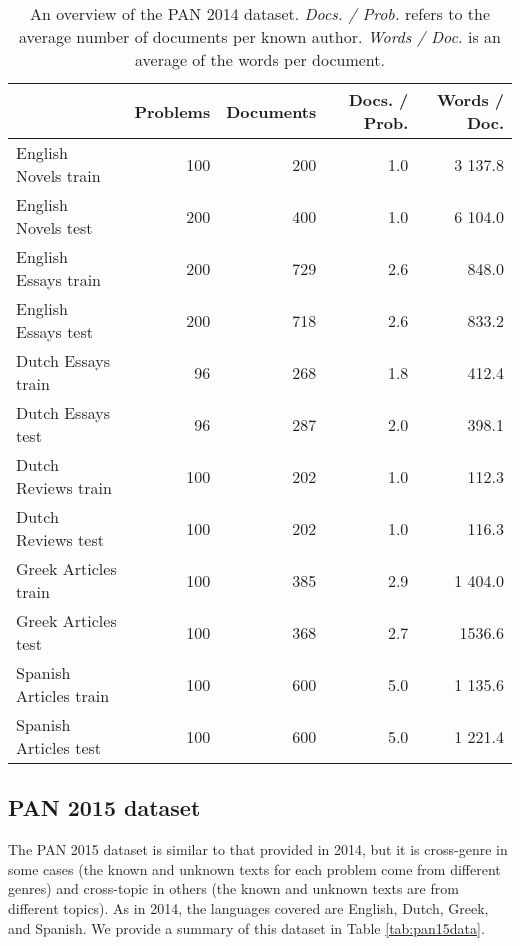 \begin{table}[!ht]
\small
\caption{\label{tab:pan14data}An overview of the PAN 2014 dataset. \textit{Docs. / Prob.} refers to the average number of documents per known author. \textit{Words / Doc.} is an average of the words per document.}
\begin{center}
\begin{tabular}{lrrrr}
\toprule
& \bf Problems & \bf Documents &\bf Docs. / Prob. & \bf Words / Doc. \\
\midrule
English Novels train & 100 & 200 & 1.0 & 3 137.8\\
English Novels test & 200 & 400 & 1.0 & 6 104.0 \\
English Essays train & 200 & 729 & 2.6 & 848.0 \\
English Essays test & 200 & 718 & 2.6 & 833.2 \\
Dutch Essays train & 96 & 268 & 1.8 & 412.4   \\
Dutch Essays test  & 96 & 287 & 2.0 & 398.1   \\
Dutch Reviews train & 100 & 202 & 1.0 & 112.3 \\
Dutch Reviews test  & 100 & 202 & 1.0 & 116.3 \\
Greek Articles train & 100& 385 & 2.9 & 1 404.0\\
Greek Articles test  & 100 & 368 & 2.7 & 1536.6\\
Spanish Articles train & 100& 600 & 5.0 & 1 135.6\\
Spanish Articles test & 100 & 600 & 5.0 & 1 221.4 \\
\bottomrule
\end{tabular}
\end{center}
\end{table}

\subsection{PAN 2015 dataset}

The PAN 2015 dataset is similar to that provided in 2014, but it is cross-genre in some cases (the known and unknown texts for each problem come from different genres) and cross-topic in others (the known and unknown texts are from different topics). As in 2014, the languages covered are English, Dutch, Greek, and Spanish. We provide a summary of this dataset in Table \ref{tab:pan15data}.


